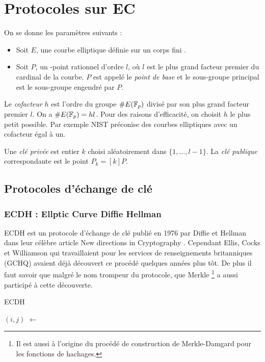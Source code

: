\chapter{Protocoles sur EC}

\noindent On se donne les paramètres suivants : 
\begin{itemize}[label=$\bullet$]
    \item Soit $E$, une courbe elliptique définie sur un corps fini .
    \item Soit $P$, un -point rationnel d'ordre $l$, où $l$ est le plus grand facteur premier du cardinal de la courbe. $P$ est appelé le \emph{point de base} et le sous-groupe principal est le sous-groupe engendré par $P$.
\end{itemize}

Le \emph{cofacteur} $h$ est l'ordre du groupe $\#E(\mathbb{F}_{p})$ divisé par son plus grand facteur premier $l$. On a $\#E(\mathbb{F}_{p}) = hl$. Pour des raisons d'efficacité, on choisit $h$ le plus petit possible. Par exemple NIST préconise des courbes elliptiques avec un cofacteur égal à un.

Une \emph{clé privée} est entier $k$ choisi aléatoirement dans $\{1, \ldots, l-1\}$. La \emph{clé publique} correspondante est le point $P_k = [k]P$.

\section{Protocoles d'échange de clé}
\subsection{ECDH : Ellptic Curve Diffie Hellman}
ECDH est un protocole d'échange de clé publié en 1976 par Diffie et Hellman dans leur célèbre article \og New directions in Cryptography \fg{}. Cependant Ellis, Cocks et Williamson qui travaillaient pour les services de renseignements britanniques (GCHQ) avaient déjà découvert ce procédé quelques années plus tôt. De plus il faut savoir que malgré le nom trompeur du protocole, que Merkle \footnote{Il est aussi à l'origine du procédé de construction de Merkle-Damgard pour les fonctions de hachages.} a aussi participé à cette découverte.
\begin{algorithm}
    \caption{ECDH}
    \label{ECDH}
    \begin{algorithmic}[1]
    
        \REQUIRE
        \ENSURE 
        \STATE $(i, j)$ \hspace{1.04cm} $\leftarrow $  
    \end{algorithmic}
\end{algorithm}

